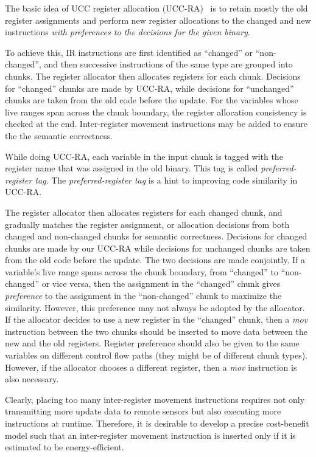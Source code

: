 The basic idea of UCC register allocation (UCC-RA)~\cite{ucc} is to retain mostly the old register assignments and perform new register allocations to the changed and new instructions {\em with preferences to the decisions for the given binary}. 

To achieve this, IR instructions are first identified as ``changed'' or ``non-changed'', and then successive instructions of the same type are grouped into chunks. The register allocator then allocates registers for each chunk.
Decisions for ``changed'' chunks are made by UCC-RA, while decisions for ``unchanged'' chunks are taken from the old code before the update. For the variables whose live ranges span across the chunk boundary, the register allocation consistency is checked at the end. Inter-register movement instructions may be added to ensure the the semantic correctness.

While doing UCC-RA, each variable in the input chunk is tagged with the register name that was assigned in the old binary. This tag is called {\em preferred-register tag}. The {\em preferred-register tag} is a hint to improving code similarity in UCC-RA.

The register allocator then allocates registers for each changed chunk, and gradually matches the register assignment, or allocation decisions from both changed and non-changed chunks for semantic correctness. Decisions for changed chunks are made by our UCC-RA while decisions for unchanged chunks are taken from the old code before the update. The two decisions are made conjointly. If a variable's live range spans across the chunk boundary, from ``changed'' to ``non-changed'' or vice versa, then the assignment in the ``changed'' chunk gives {\em preference} to the assignment in the ``non-changed'' chunk to maximize the similarity. However, this preference may not always be adopted by the allocator. If the allocator decides to use a new register in the ``changed'' chunk, then a {\it mov} instruction between the two chunks should be inserted to move data between the new and the old registers. Register preference should also be given to the same variables on different control flow paths (they might be of different chunk types). However, if the allocator chooses a different register, then a {\it mov} instruction is also necessary.

Clearly, placing too many inter-register movement instructions requires not only transmitting more update data to remote sensors but also executing more instructions at runtime. Therefore, it is desirable to develop a precise cost-benefit model such that an inter-register movement instruction is inserted only if it is estimated to be energy-efficient.

